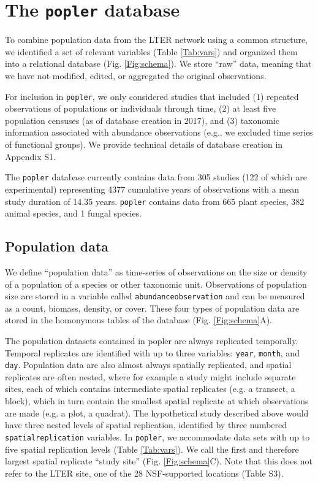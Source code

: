 \documentclass{article}\usepackage[]{graphicx}\usepackage[]{color}
\begin{document}
\section*{The \texttt{popler} database}
To combine population data from the LTER network using a common structure, we identified a set of relevant variables (Table \ref{Tab:vars}) and organized them into a relational database (Fig. \ref{Fig:schema}). We store ``raw'' data, meaning that we have not modified, edited, or aggregated the original observations. 

For inclusion in \texttt{popler}, we only considered studies that included (1) repeated observations of populations or individuals through time, (2) at least five population censuses (as of database creation in 2017), and (3) taxonomic information associated with abundance observations (e.g., we excluded time series of functional groups). We provide technical details of database creation in Appendix S1.


The \texttt{popler} database currently contains data from 305 studies (122 of which are experimental) representing 4377 cumulative years of observations with a mean study duration of 14.35 years. \texttt{popler} contains data from 665 plant species, 382 animal species, and 1 fungal species.

\subsection*{Population data}
We define ``population data'' as time-series of observations on the size or density of a population of a species or other taxonomic unit. Observations of population size are stored in a variable called \texttt{abundance\textunderscore observation} and can be measured as a count, biomass, density, or cover. These four types of population data are stored in the homonymous tables of the database (Fig. \ref{Fig:schema}A).

The population datasets contained in popler are always replicated temporally. Temporal replicates are identified with up to three variables: \texttt{year}, \texttt{month}, and \texttt{day}. Population data are also almost always spatially replicated, and spatial replicates are often nested, where for example a study might include separate sites, each of which contains intermediate spatial replicates (e.g. a transect, a block), which in turn contain the smallest spatial replicate at which observations are made (e.g. a plot, a quadrat). The hypothetical study described above would have three nested levels of spatial replication, identified by three numbered \texttt{spatial\textunderscore replication} variables. In \texttt{popler}, we accommodate data sets with up to five spatial replication levels (Table \ref{Tab:vars}). We call the first and therefore largest spatial replicate ``study site'' (Fig. \ref{Fig:schema}C). Note that this does not refer to the LTER site, one of the 28 NSF-supported locations (Table S3).
\end{document}
